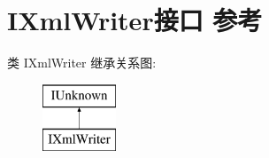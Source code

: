 \hypertarget{interface_i_xml_writer}{}\section{I\+Xml\+Writer接口 参考}
\label{interface_i_xml_writer}
类 I\+Xml\+Writer 继承关系图\+:\begin{figure}[H]
\begin{center}
\leavevmode
\includegraphics[height=2.000000cm]{interface_i_xml_writer}
\end{center}
\end{figure}
